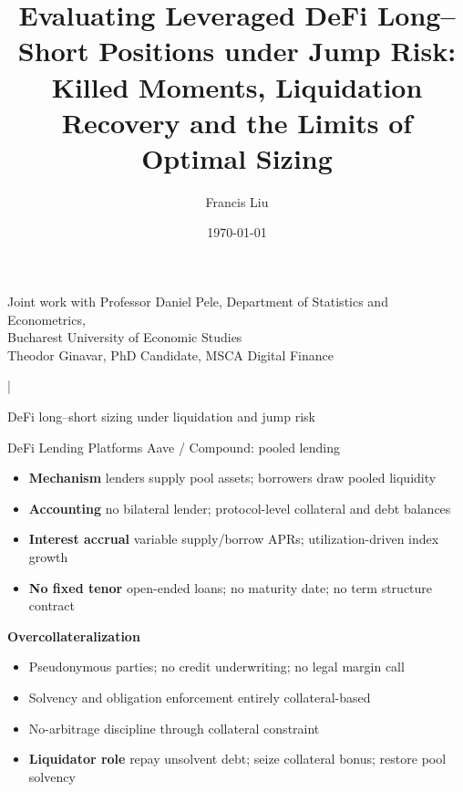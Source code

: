 \documentclass[aspectratio=169,10pt]{beamer}
\title[Evaluating leveraged DeFi long--short positions]{Evaluating Leveraged DeFi Long--Short Positions under Jump Risk: Killed Moments, Liquidation Recovery and the Limits of Optimal Sizing}
\author{Francis Liu}
\institute{Working paper}
\date{\today}
\begin{document}
\begin{frame}
  \vspace{1.0em}
  {\inserttitle\par}
  \vspace{1.2em}
  {\insertauthor\par}
  \vspace{0.7em}
  {
    Joint work with Professor Daniel Pele, Department of Statistics and Econometrics,\\
    Bucharest University of Economic Studies\\
    Theodor Ginavar, PhD Candidate, MSCA Digital Finance\par}
  {\insertinstitute\hspace{0.6em}|\hspace{0.6em}\insertdate\par}
  \vfill
  \begin{center}
  \end{center}
  \vspace{0.8em}
  \large DeFi long--short sizing under liquidation and jump risk
\end{frame}

\begin{frame}{DeFi Lending Platforms}
  \small
  Aave / Compound: pooled lending
  \vspace{0.4em}

  \begin{itemize}
    \item \textbf{Mechanism} lenders supply pool assets; borrowers draw pooled liquidity
    \item \textbf{Accounting} no bilateral lender; protocol-level collateral and debt balances
    \item \textbf{Interest accrual} variable supply/borrow APRs; utilization-driven index growth
    \item \textbf{No fixed tenor} open-ended loans; no maturity date; no term structure contract
  \end{itemize}

  \vspace{0.25em}
  \textbf{Overcollateralization}
  \begin{itemize}
    \item Pseudonymous parties; no credit underwriting; no legal margin call
    \item Solvency and obligation enforcement entirely collateral-based
    \item No-arbitrage discipline through collateral constraint
    \item \textbf{Liquidator role} repay unsolvent debt; seize collateral bonus; restore pool solvency
  \end{itemize}

\end{frame}
\end{document}
